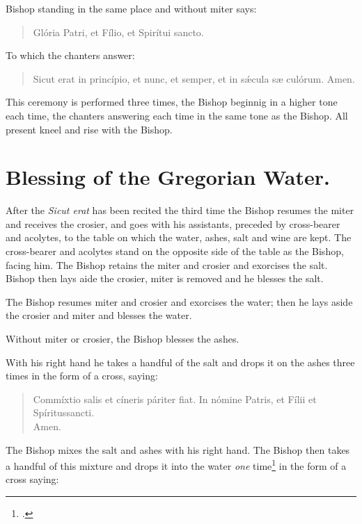 \documentclass[letterpaper]{report}
\begin{document}
{    Bishop standing in the same place and without miter says:

    \begin{quote}
        \vbar Glória Patri, et Fílio, et Spirítui sancto.
    \end{quote}

    To which the chanters answer:

    \begin{quote}
        \rbar Sicut erat in princípio, et nunc, et semper, et in s\'\ae cula s\ae
        culórum. Amen.
    \end{quote}

    This ceremony is performed three times, the Bishop beginnig in a higher
    tone each time, the chanters answering each time in the same tone as the
    Bishop. All present kneel and rise with the Bishop. 

    \section{Blessing of the Gregorian Water.}

    \rubric After the \textit{Sicut erat} has been recited the third time the
    Bishop resumes the miter and receives the crosier, and goes with his
    assistants, preceded by cross-bearer and acolytes, to the table on which
    the water, ashes, salt and wine are kept. The cross-bearer and acolytes
    stand on the opposite side of the table as the Bishop, facing him. The
    Bishop retains the miter and crosier and exorcises the salt. Bishop then
    lays aide the crosier, miter is removed and he blesses the salt.

    \rubric The Bishop resumes miter and crosier and exorcises the water; then
    he lays aside the crosier and miter and blesses the water. 

    \rubric Without miter or crosier, the Bishop blesses the ashes.

    \rubric With his right hand he takes a handful of the salt and drops it on
    the ashes three times in the form of a cross, saying:

    \begin{quote}
       Commíxtio salis et cíneris páriter fiat. In nómine Pa\cross tris, et
        Fí\cross lii et Spíritus\cross sancti. \\
       \rbar Amen.
    \end{quote}

    The Bishop mixes the salt and ashes with his right hand. The Bishop then
    takes a handful of this mixture and drops it into the water \textit{one}
    time\footcite[The Pontifical seems to indicate that the bishop performs
    this ceremony \textit{three times,} but the authors imply that it is done
    only \textit{once.}][footnote 1, p. 60.]{consecranda} in the form of a
    cross saying:

}
\end{document}
